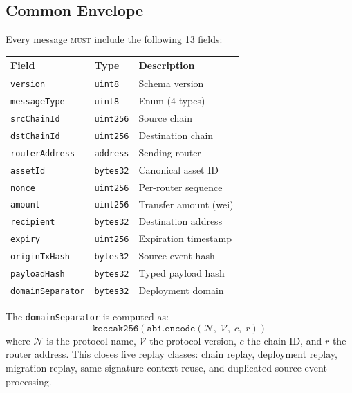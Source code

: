 \documentclass[11pt,twocolumn]{article}
\theoremstyle{remark}
\begin{document}
\subsection{Common Envelope}

Every message \textsc{must} include the following 13 fields:

\begin{center}
\small
\begin{tabular}{@{}lll@{}}
\toprule
\textbf{Field} & \textbf{Type} & \textbf{Description} \\
\midrule
\texttt{version}         & \texttt{uint8}   & Schema version \\
\texttt{messageType}     & \texttt{uint8}   & Enum (4 types) \\
\texttt{srcChainId}      & \texttt{uint256} & Source chain \\
\texttt{dstChainId}      & \texttt{uint256} & Destination chain \\
\texttt{routerAddress}   & \texttt{address} & Sending router \\
\texttt{assetId}         & \texttt{bytes32} & Canonical asset ID \\
\texttt{nonce}           & \texttt{uint256} & Per-router sequence \\
\texttt{amount}          & \texttt{uint256} & Transfer amount (wei) \\
\texttt{recipient}       & \texttt{bytes32} & Destination address \\
\texttt{expiry}          & \texttt{uint256} & Expiration timestamp \\
\texttt{originTxHash}    & \texttt{bytes32} & Source event hash \\
\texttt{payloadHash}     & \texttt{bytes32} & Typed payload hash \\
\texttt{domainSeparator} & \texttt{bytes32} & Deployment domain \\
\bottomrule
\end{tabular}
\end{center}

The \texttt{domainSeparator} is computed as:
\begin{equation}
\texttt{keccak256}\!\left(\texttt{abi.encode}\!\left(\mathcal{N},\; \mathcal{V},\; c,\; r\right)\right)
\end{equation}
where $\mathcal{N}$ is the protocol name, $\mathcal{V}$ the protocol version, $c$ the chain ID, and $r$ the router address. This closes five replay classes: chain replay, deployment replay, migration replay, same-signature context reuse, and duplicated source event processing.
\end{document}
